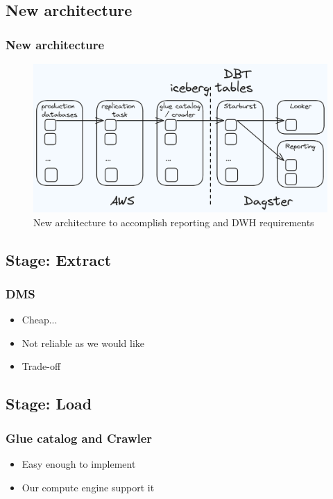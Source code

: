 \documentclass{beamer}
\begin{document}
\subsection{New architecture}

\begin{frame}
    \frametitle{New architecture}
    \begin{figure}
        \centering
        \includegraphics[width=1\textwidth]{pictures/architecture}
        \caption{New architecture to accomplish reporting and DWH requirements}
    \end{figure}
\end{frame}

\subsection{Stage: Extract}
\begin{frame}
    \frametitle{DMS}
    \begin{itemize}
        \item Cheap...
        \item Not reliable as we would like
        \item Trade-off
    \end{itemize}
\end{frame}

\subsection{Stage: Load}
\begin{frame}
    \frametitle{Glue catalog and Crawler}
    \begin{itemize}
        \item Easy enough to implement
        \item Our compute engine support it
    \end{itemize}
\end{frame}
\end{document}
